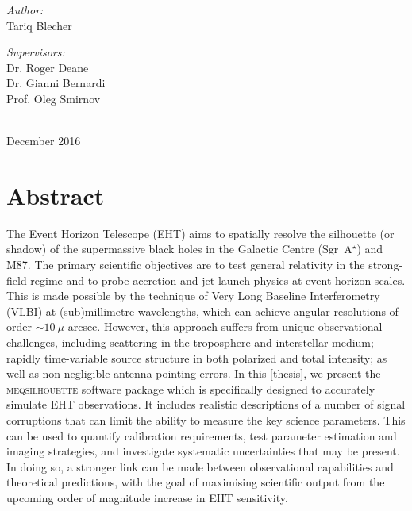 \begin{titlepage}
\begin{minipage}{0.45\textwidth}
\begin{flushleft}\large 
\emph{Author:} \\
Tariq  {\sc Blecher}\\
\end{flushleft}
\end{minipage}
\begin{minipage}{0.45\textwidth}

\begin{flushright} \large
\emph{Supervisors:} \\
Dr. Roger {\sc Deane} \\
Dr. Gianni {\sc Bernardi} \\
Prof. Oleg {\sc Smirnov} \\
\end{flushright}
\end{minipage}\\[2cm]


{\large December 2016}

\end{titlepage}

\chapter*{Abstract} 
The Event Horizon Telescope (EHT) aims to spatially resolve the silhouette (or shadow) of the supermassive black holes in the Galactic Centre (Sgr~A$^\star$) and M87. The primary scientific objectives are to test general relativity in the strong-field regime and to probe accretion and jet-launch physics at event-horizon scales. This is made possible by the technique of Very Long Baseline Interferometry (VLBI) at (sub)millimetre wavelengths, which can achieve angular resolutions of order $\sim10~\mu$-arcsec. However, this approach suffers from unique observational challenges, including scattering in the troposphere and interstellar medium; rapidly time-variable source structure in both polarized and total intensity; as well as non-negligible antenna pointing errors. In this [thesis], we present the \textsc{meqsilhouette} software package which is specifically designed to accurately simulate EHT observations. It includes realistic descriptions of a number of signal corruptions that can limit the ability to measure the key science parameters. This can be used to quantify calibration requirements, test parameter estimation and imaging strategies, and investigate systematic uncertainties that may be present. In doing so, a stronger link can be made between observational capabilities and theoretical predictions, with the goal of maximising scientific output from the upcoming order of magnitude increase in EHT sensitivity. 

